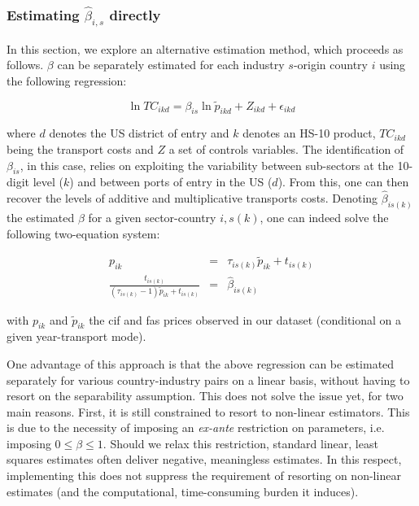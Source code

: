 \documentclass[11pt,twoside, authoryear]{elsarticle}
\begin{document}
\subsubsection{Estimating $\widehat{\beta}_{i,s}$ directly}
	
In this section, we explore an alternative estimation method, which proceeds as follows. $\beta$ can be separately estimated for each industry $s$-origin country $i$ using the following regression:

\begin{equation}
\ln TC_{ikd} = \beta_{is}\ln \tilde{p}_{ikd} + Z_{ikd} +\epsilon_{ikd} \label{eq:estimation_ref1}
\end{equation}

where $d$ denotes the US district of entry and $k$ denotes an HS-10 product, $TC_{ikd}$ being the transport costs and $Z$ a set of controls variables. The identification of $\beta_{is}$, in this case, relies on exploiting the variability between sub-sectors at the 10-digit
level ($k$) and between ports of entry in the US ($d$). From this, one can then recover the levels of additive and multiplicative transports costs. Denoting $\widehat{\beta}_{is(k)}$ the estimated $\beta$ for a given sector-country $i,s(k)$, one can indeed solve the following two-equation system:

\begin{eqnarray*}
p_{ik} &=& \tau_{is(k)}\widetilde{p}_{ik} +t_{is(k)} \label{eq:system1}\\
\frac{t_{is(k)}}{(\tau_{is(k)}-1)\widetilde{p}_{ik}+ t_{is(k)}} &=& \widehat{\beta}_{is(k)}  \label{eq:system2}
\end{eqnarray*}


\noindent with $p_{ik}$ and $\widetilde{p}_{ik}$ the cif and fas prices observed in our dataset (conditional on a given year-transport mode).

One advantage of this approach is that the above regression can be estimated separately for various country-industry pairs on a linear basis, without having to resort on the separability assumption. This does not solve the issue yet, for two main reasons. First, it is still constrained to resort to non-linear estimators. This is due to the necessity of imposing an \textit{ex-ante} restriction on parameters, i.e. imposing $0 \leq  \beta \leq 1$. Should we relax this restriction, standard linear, least squares estimates often deliver negative, meaningless estimates. In this respect, implementing this does not suppress the requirement of resorting on non-linear estimates (and the computational, time-consuming burden it induces).
\end{document}
